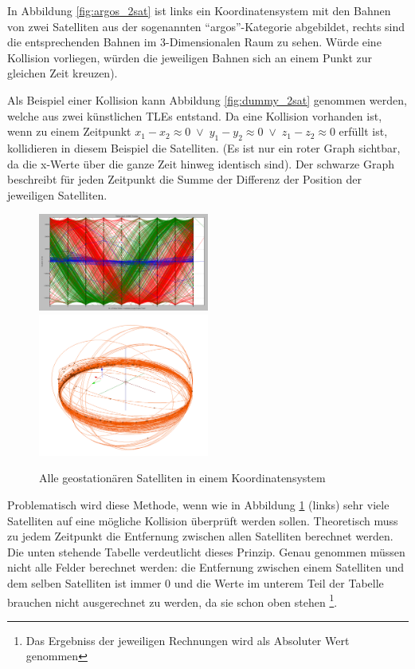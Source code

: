 In Abbildung \ref{fig:argos_2sat} ist links ein Koordinatensystem mit den Bahnen von zwei
Satelliten aus der sogenannten ``argos''-Kategorie abgebildet, rechts sind die entsprechenden
Bahnen im 3-Dimensionalen Raum zu sehen. Würde eine Kollision vorliegen, würden die jeweiligen
Bahnen sich an einem Punkt zur gleichen Zeit kreuzen).
\par
Als Beispiel einer Kollision kann Abbildung \ref{fig:dummy_2sat} genommen werden, welche aus zwei
künstlichen TLEs entstand. Da eine Kollision vorhanden ist, wenn zu einem Zeitpunkt
\( x_1 - x_2 \approx 0 \; \vee \; y_1 - y_2 \approx 0 \; \vee \; z_1 - z_2 \approx 0\) erfüllt ist,
kollidieren in diesem Beispiel die Satelliten.
(Es ist nur ein roter Graph sichtbar, da die x-Werte über die ganze Zeit hinweg identisch sind).
Der schwarze Graph beschreibt für jeden Zeitpunkt die Summe der Differenz der Position der
jeweiligen Satelliten.

\begin{figure}[h]
 \centerline{
 \includegraphics[width=0.5\textwidth]{figs/geo_allsat_2D}
 \includegraphics[width=0.5\textwidth]{figs/geo_allsat_3D_w}
 }
 \caption{Alle geostationären Satelliten in einem Koordinatensystem}
 \label{fig:geo_allsat}
\end{figure}

\bigskip

Problematisch wird diese Methode, wenn wie in Abbildung \ref{fig:geo_allsat} (links) sehr viele Satelliten
auf eine mögliche Kollision überprüft werden sollen. Theoretisch muss zu jedem Zeitpunkt die
Entfernung zwischen allen Satelliten berechnet werden. Die unten stehende Tabelle verdeutlicht
dieses Prinzip. Genau genommen müssen nicht alle Felder berechnet werden: die Entfernung zwischen
einem Satelliten und dem selben Satelliten ist immer 0 und die Werte im unterem Teil der
Tabelle brauchen nicht ausgerechnet zu werden, da sie schon oben stehen \footnote{Das Ergebniss der jeweiligen Rechnungen wird als Absoluter Wert genommen}. 


